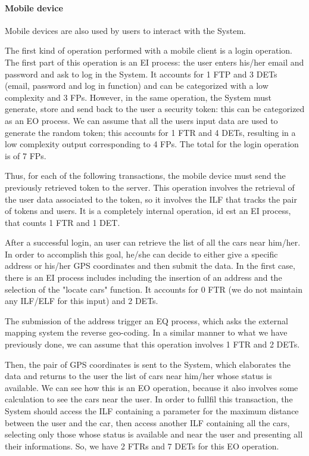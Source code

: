 \paragraph{Mobile device}
Mobile devices are also used by users to interact with the System. 

The first kind of operation performed with a mobile client is a login operation. 
The first part of this operation is an EI process: the user enters his/her email and password and ask to log in the System. It accounts for 1 FTP and 3 DETs (email, password and log in function) and can be categorized with a low complexity and 3 FPs.
However, in the same operation, the System must generate, store and send back to the user a security token: this can be categorized as an EO process. We can assume that all the users input data are used to generate the random token; this accounts for 1 FTR and 4 DETs, resulting in a low complexity output corresponding to 4 FPs.
The total for the login operation is of 7 FPs.
\smallskip

Thus, for each of the following transactions, the mobile device must send the previously retrieved token to the server. This operation involves the retrieval of the user data associated to the token, so it involves the ILF that tracks the pair of tokens and users. It is a completely internal operation, id est an EI process, that counts 1 FTR and 1 DET.
\smallskip

After a successful login, an user can retrieve the list of all the cars near him/her. In order to accomplish this goal, he/she can decide to either give a specific address or his/her GPS coordinates and then submit the data.
In the first case, there is an EI process includes including the insertion of an address and the selection of the "locate cars" function. It accounts for 0 FTR (we do not maintain any ILF/ELF for this input) and 2 DETs.
 
The submission of the address trigger an EQ process, which asks the external mapping system the reverse geo-coding. In a similar manner to what we have previously done, we can assume that this operation involves 1 FTR and 2 DETs.

Then, the pair of GPS coordinates is sent to the System, which elaborates the data and returns to the user the list of cars near him/her whose status is available. We can see how this is an EO operation, because it also involves some calculation to see the cars near the user. In order to fullfil this transaction, the System should access the ILF containing a parameter for the maximum distance between the user and the car, then access another ILF containing all the cars, selecting only those whose status is available and near the user and presenting all their informations. So, we have 2 FTRs and 7 DETs for this EO operation.

